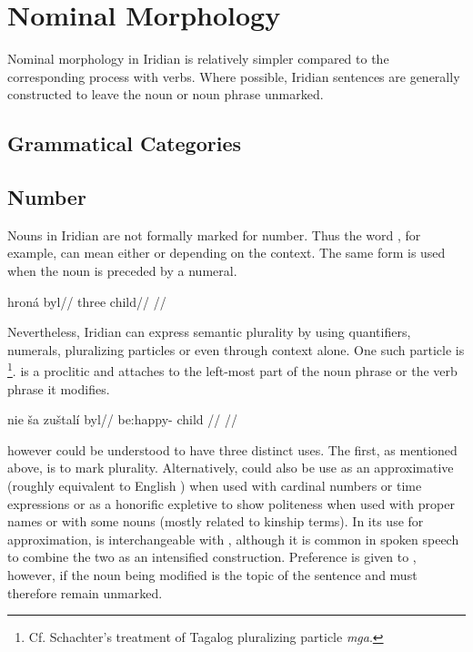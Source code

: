 \chapter{Nominal Morphology}

Nominal morphology in Iridian is relatively simpler compared to the corresponding process with verbs. Where possible, Iridian sentences are generally constructed to leave the noun or noun phrase unmarked.

\section{Grammatical Categories}

\section{Number}

Nouns in Iridian are not formally marked for number. Thus the word , for example, can mean either  or  depending on the context. The same form is used when the noun is preceded by a numeral.

\pex
\begingl
\gla hron\'a byl//
\glb three child//
\glft {}//
\endgl
\xe

Nevertheless, Iridian can express semantic plurality by using quantifiers, numerals, pluralizing particles or even through context alone. One such particle is \label{sec:plurals}\footnote{Cf. Schachter's treatment of Tagalog pluralizing particle \emph{mga}.}.  is a proclitic and attaches to the left-most part of the noun phrase or the verb phrase it modifies.

\pex
\begingl
    \gla nie \v{s}a zu\v{s}tal\'i byl//
    \glb {}  be:happy- child //
    \glft {}//
\endgl
\xe

 however could be understood to have three distinct uses. The first, as mentioned above, is to mark plurality. Alternatively,  could also be use as an approximative (roughly equivalent to English ) when used with cardinal numbers or time expressions or as a honorific expletive to show politeness when used with proper names or with some nouns (mostly related to kinship terms). In its use for approximation,  is interchangeable with , although it is common in spoken speech to combine the two as an intensified construction. Preference is given to , however, if the noun being modified is the topic of the sentence and must therefore remain unmarked.

